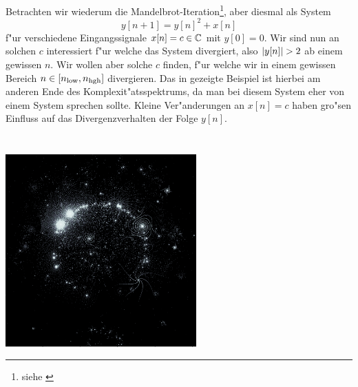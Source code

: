 Betrachten wir wiederum die Mandelbrot-Iteration\footnote{siehe \href{%
https://github.com/SebastianSemper/lecturenotes/blob/main/dsv/code/mandelbrot.py
}{}}, aber diesmal als System
\[
    y[n+1] = y[n]^2 + x[n]
\]
f"ur verschiedene Eingangssignale $x[n] = c \in \mathbb{C}$ mit $y[0] = 0$.
Wir sind nun an solchen $c$ interessiert f"ur welche das System divergiert, also ${\left| y[n] \right|} > 2$ ab einem gewissen $n$.
Wir wollen aber solche $c$ finden, f"ur welche wir in einem gewissen Bereich $n \in [n_{\rm low}, n_{\rm hgh}]$ divergieren.
Das in  gezeigte Beispiel ist hierbei am anderen Ende des Komplexit"atsspektrums, da man bei diesem System eher von einem  System sprechen sollte. 
Kleine Ver"anderungen an $x[n] = c$ haben gro"sen Einfluss auf das Divergenzverhalten der Folge $y[n]$.
\begin{listing}
    \noindent
    \begin{minipage}{0.49\textwidth}
        \strut\vspace*{-\baselineskip}\newline
        \inputminted[firstline=5,lastline=26]{python3}{code/buddhabrot.py}
    \end{minipage}%
    \begin{minipage}{0.49\textwidth}
        \strut\vspace*{-\baselineskip}\newline
        \inputminted[firstline=29,lastline=53]{python3}{code/buddhabrot.py}
    \end{minipage}

    \begin{center}
        \includegraphics[width=0.55\textwidth]{code/buddhabrot.png}
    \end{center}
    \label{py:buddhabrot}
\end{listing}

